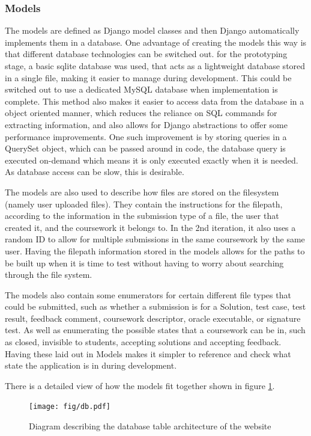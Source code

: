 \documentclass[a4paper,11pt]{report}
\begin{document}
\subsubsection{Models}
The models are defined as Django model classes and then Django automatically implements them in a database. One advantage of creating the models this way is that different database technologies can be switched out. for the prototyping stage, a basic sqlite database was used, that acts as a lightweight database stored in a single file, making it easier to manage during development. This could be switched out to use a dedicated MySQL database when implementation is complete. This method also makes it easier to access data from the database in a object oriented manner, which reduces the reliance on SQL commands for extracting information, and also allows for Django abstractions to offer some performance improvements. One such improvement is by storing queries in a QuerySet object, which can be passed around in code, the database query is executed on-demand which means it is only executed exactly when it is needed. As database access can be slow, this is desirable.\par
The models are also used to describe how files are stored on the filesystem (namely user uploaded files). They contain the instructions for the filepath, according to the information in the submission type of a file, the user that created it, and the coursework it belongs to. In the 2nd iteration, it also uses a random ID to allow for multiple submissions in the same coursework by the same user. Having the filepath information stored in the models allows for the paths to be built up when it is time to test without having to worry about searching through the file system.\par
The models also contain some enumerators for certain different file types that could be submitted, such as whether a submission is for a Solution, test case, test result, feedback comment, coursework descriptor, oracle executable, or signature test. As well as enumerating the possible states that a coursework can be in, such as closed, invisible to students, accepting solutions and accepting feedback. Having these laid out in Models makes it simpler to reference and check what state the application is in during development.\par
There is a detailed view of how the models fit together shown in figure \ref{fig:db-arc}.
\begin{figure}
	\texttt{[image: fig/db.pdf]}
	\label{fig:db-arc}
	\caption{Diagram describing the database table architecture of the website}
\end{figure}
\end{document}
